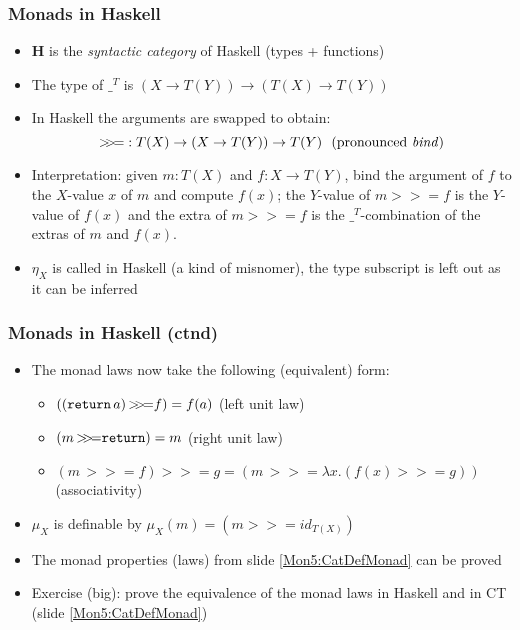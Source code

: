 \documentclass[handout]{beamer}
\newcommand{\bfsf}[1]{{\boldsymbol{#1}}}
\newcommand{\HH}{\bfsf{H}}
\newcommand{\bind}{{>}\!\!{>}\!{=}}
\newcommand{\ttt}[1]{\text{\tt #1}}
\begin{document}
\frame
  {   
    \frametitle{Monads in Haskell}\label{Mon5:MonadHask}

 \begin{itemize}[<+->]
\item $\HH$ is the \emph{syntactic category} of Haskell (types + functions)
\item The type of $\_^T$ is $(X\to T(Y)) \to (T(X)\to T(Y))$
\item In Haskell the arguments are swapped to obtain:
$$\bind : T(X) \to (X\to T(Y)) \to T(Y)~~\text{(pronounced \emph{bind}})$$
\item Interpretation: given $m:T(X)$ and $f: X\to T(Y)$, %
bind the argument of $f$ to the $X$-value $x$ of $m$ and compute $f(x)$;
the $Y$-value of $m\bind f$ is the $Y$-value of $f(x)$ and
the extra of $m\bind f$ is the $\_^T$-combination of 
the extras of $m$ and $f(x)$.
\item $\eta_X$ is called \ttt{return} in Haskell (a kind of misnomer),
the type subscript is left out as it can be inferred


 \end{itemize}

 }

\frame
  {   
    \frametitle{Monads in Haskell (ctnd)}\label{Mon5:MonadHaskCtnd}

 \begin{itemize}[<+->]
\item The monad laws now take the following (equivalent) form:
\begin{itemize}
    \item $((\ttt{return}\,a)\, \bind f) = f(a)$ (left unit law)
    \item $(m\, \bind \ttt{return}) = m$ (right unit law)
    \item $(m\, \bind f) \bind g = (m\, \bind \lambda x. (f(x) \bind g))$ (associativity)
 \end{itemize}
\item $\mu_X$ is definable by $\mu_X(m) = (m\bind id_{T(X)})$
\item The monad properties (laws) from slide \ref{Mon5:CatDefMonad} can be proved
\item Exercise (big): prove the equivalence of the monad laws in Haskell 
and in CT (slide \ref{Mon5:CatDefMonad})
 \end{itemize}

 }
\end{document}
